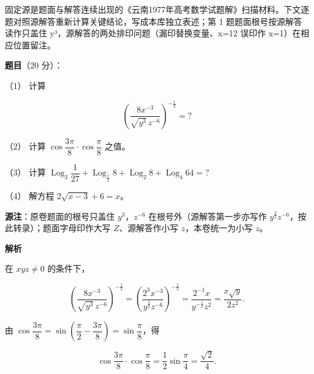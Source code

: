 

\begin{gktip}
固定源是题面与解答连续出现的《云南1977年高考数学试题解》扫描材料。下文逐题对照源解答重新计算关键结论，写成本库独立表述；第 1 题题面根号按源解答读作只盖住 y³，源解答的两处排印问题（漏印替换变量、x=12 误印作 x=1）在相应位置留注。
\end{gktip}

\begin{answer}

\textbf{题目}（20 分）：

（1） 计算

\nopagebreak[4]
\[
\left(\frac{8x^{-3}}{\sqrt{y^{3}}\,z^{-6}}\right)^{-\frac13}=?
\]

（2） 计算 $\cos\dfrac{3\pi}{8}\cdot\cos\dfrac{\pi}{8}$ 之值。

（3） 计算 $\operatorname{Log}_3\dfrac{1}{27}+\operatorname{Log}_{\frac12}8+\operatorname{Log}_2 8+\operatorname{Log}_4 64=$?

（4） 解方程 $2\sqrt{x-3}+6=x$。

\begin{gktip}
\textbf{源注}：原卷题面的根号只盖住 $y^{3}$，$z^{-6}$ 在根号外（源解答第一步亦写作 $y^{\frac32}z^{-6}$，按此转录）；题面字母印作大写 $Z$、源解答作小写 $z$，本卷统一为小写 $z$。
\end{gktip}

\textbf{解析}


在 $xyz\ne0$ 的条件下，

\nopagebreak[4]
\[
\left(\frac{8x^{-3}}{\sqrt{y^{3}}\,z^{-6}}\right)^{-\frac13}
=\left(\frac{2^{3}x^{-3}}{y^{\frac32}z^{-6}}\right)^{-\frac13}
=\frac{2^{-1}x}{y^{-\frac12}z^{2}}
=\frac{x\sqrt y}{2z^{2}}.
\]


由 $\cos\dfrac{3\pi}{8}=\sin\left(\dfrac{\pi}{2}-\dfrac{3\pi}{8}\right)=\sin\dfrac{\pi}{8}$，得

\nopagebreak[4]
\[
\cos\frac{3\pi}{8}\cdot\cos\frac{\pi}{8}
=\frac12\sin\frac{\pi}{4}
=\frac{\sqrt2}{4}.
\]



\end{answer}
